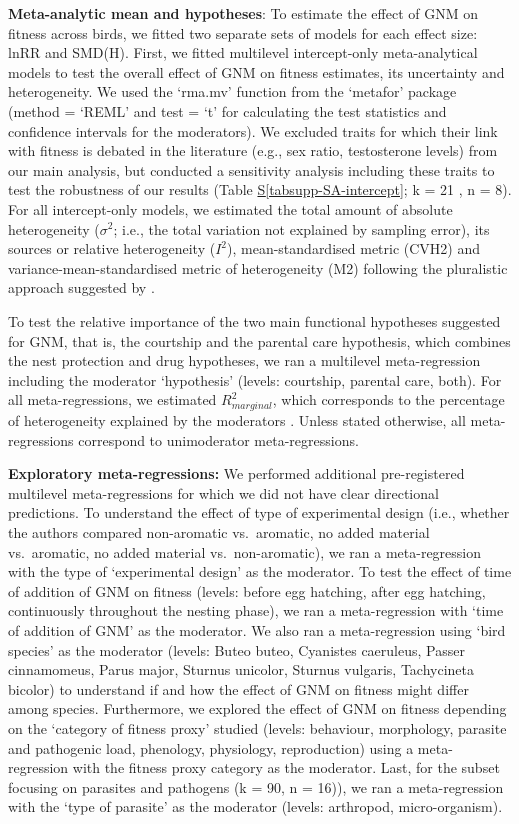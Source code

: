 \documentclass[
  number,
  review,
  onecolumn]{elsarticle}
\newcommand*\quartotabsuppref[1]{Table \hyperref[#1]{S\ref{#1}}}
\begin{document}
\textbf{Meta-analytic mean and hypotheses}: To estimate the effect of
GNM on fitness across birds, we fitted two separate sets of models for
each effect size: lnRR and SMD(H). First, we fitted multilevel
intercept-only meta-analytical models to test the overall effect of GNM
on fitness estimates, its uncertainty and heterogeneity. We used the
`rma.mv' function from the `metafor' package (method = `REML' and test =
`t' for calculating the test statistics and confidence intervals for the
moderators). We excluded traits for which their link with fitness is
debated in the literature (e.g., sex ratio, testosterone levels) from
our main analysis, but conducted a sensitivity analysis including these
traits to test the robustness of our results
(\quartotabsuppref{tabsupp-SA-intercept}; k = 21 , n = 8). For all
intercept-only models, we estimated the total amount of absolute
heterogeneity (\(σ^2\); i.e., the total variation not explained by
sampling error), its sources or relative heterogeneity (\(I^2\)),
mean-standardised metric (CVH2) and variance-mean-standardised metric of
heterogeneity (M2) following the pluralistic approach suggested by
\citep{yang2024a} .

To test the relative importance of the two main functional hypotheses
suggested for GNM, that is, the courtship and the parental care
hypothesis, which combines the nest protection and drug hypotheses, we
ran a multilevel meta-regression including the moderator `hypothesis'
(levels: courtship, parental care, both). For all meta-regressions, we
estimated \(R_{marginal}^2\), which corresponds to the percentage of
heterogeneity explained by the moderators \citep{nakagawa2012}. Unless
stated otherwise, all meta-regressions correspond to unimoderator
meta-regressions.

\textbf{Exploratory meta-regressions:} We performed additional
pre-registered multilevel meta-regressions for which we did not have
clear directional predictions. To understand the effect of type of
experimental design (i.e., whether the authors compared non-aromatic
vs.~aromatic, no added material vs.~aromatic, no added material
vs.~non-aromatic), we ran a meta-regression with the type of
`experimental design' as the moderator. To test the effect of time of
addition of GNM on fitness (levels: before egg hatching, after egg
hatching, continuously throughout the nesting phase), we ran a
meta-regression with `time of addition of GNM' as the moderator. We also
ran a meta-regression using `bird species' as the moderator (levels:
Buteo buteo, Cyanistes caeruleus, Passer cinnamomeus, Parus major,
Sturnus unicolor, Sturnus vulgaris, Tachycineta bicolor) to understand
if and how the effect of GNM on fitness might differ among species.
Furthermore, we explored the effect of GNM on fitness depending on the
`category of fitness proxy' studied (levels: behaviour, morphology,
parasite and pathogenic load, phenology, physiology, reproduction) using
a meta-regression with the fitness proxy category as the moderator.
Last, for the subset focusing on parasites and pathogens (k = 90, n =
16)), we ran a meta-regression with the `type of parasite' as the
moderator (levels: arthropod, micro-organism).~
\end{document}

